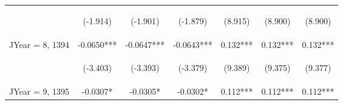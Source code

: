 \documentclass[]{article}
\begin{document}
\begin{center}
\begin{tabular}{lcccccc}
        \vspace{4pt}     & \begin{footnotesize}(-1.914)\end{footnotesize} & \begin{footnotesize}(-1.901)\end{footnotesize} & \begin{footnotesize}(-1.879)\end{footnotesize} & \begin{footnotesize}(8.915)\end{footnotesize}  & \begin{footnotesize}(8.900)\end{footnotesize}  & \begin{footnotesize}(8.900)\end{footnotesize}  \\
        JYear = 8, 1394  & -0.0650***                                     & -0.0647***                                     & -0.0643***                                     & 0.132***                                       & 0.132***                                       & 0.132***                                       \\
        \vspace{4pt}     & \begin{footnotesize}(-3.403)\end{footnotesize} & \begin{footnotesize}(-3.393)\end{footnotesize} & \begin{footnotesize}(-3.379)\end{footnotesize} & \begin{footnotesize}(9.389)\end{footnotesize}  & \begin{footnotesize}(9.375)\end{footnotesize}  & \begin{footnotesize}(9.377)\end{footnotesize}  \\
        JYear = 9, 1395  & -0.0307*                                       & -0.0305*                                       & -0.0302*                                       & 0.112***                                       & 0.112***                                       & 0.112***                                       \\

\end{tabular}
\end{center}
\end{document}
